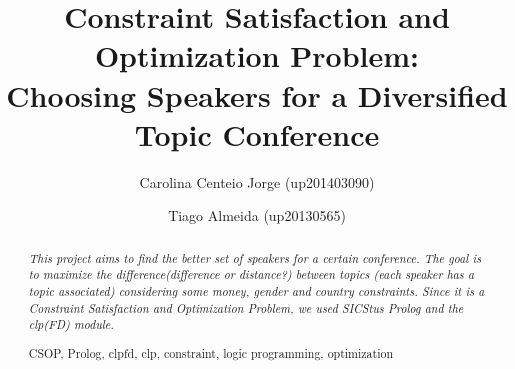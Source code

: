 \documentclass[runningheads,a4paper]{llncs}
\newcommand{\keywords}[1]{\par\addvspace\baselineskip
\noindent\keywordname\enspace\ignorespaces#1}
\begin{document}
\mainmatter  %

\title{Constraint Satisfaction and Optimization Problem:\\Choosing Speakers for a Diversified Topic Conference}


%
%
\author{Carolina Centeio Jorge (up201403090)
\and Tiago Almeida (up20130565)}
%


%
%

\maketitle


\begin{abstract}
\emph{This project aims to find the better set of speakers for a certain conference. The goal is to maximize the difference\textit{(difference or distance?)} between topics (each speaker has a topic associated) considering some money, gender and country constraints. Since it is a Constraint Satisfaction and Optimization Problem, we used SICStus Prolog and the clp(FD) module.}
\keywords{CSOP, Prolog, clpfd, clp, constraint, logic programming, optimization}
\end{abstract}
\end{document}

